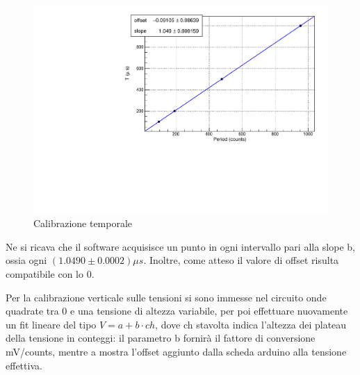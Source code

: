 \documentclass{article}
\begin{document}
\begin{center}
\begin{figure}[H]
\centering
\includegraphics[scale=0.4, angle=0]{calibtempi.pdf}
\caption{Calibrazione temporale}
\label{fig:calibtempi}
\end{figure}
\end{center}


Ne si ricava che il software acquisisce un punto in ogni intervallo pari alla slope b, ossia ogni $(1.0490 \pm 0.0002)\mu s$.
Inoltre, come atteso il valore di offset risulta compatibile con lo 0.

Per la calibrazione verticale sulle tensioni si sono immesse nel circuito onde quadrate tra 0 e una tensione di altezza variabile, 
per poi effettuare nuovamente un fit lineare del tipo $V = a + b \cdot ch$, dove ch stavolta indica l'altezza dei plateau della tensione 
in conteggi: il parametro b fornirà il fattore di conversione mV/counts, mentre a mostra l'offset aggiunto dalla scheda arduino alla tensione effettiva.
\end{document}
